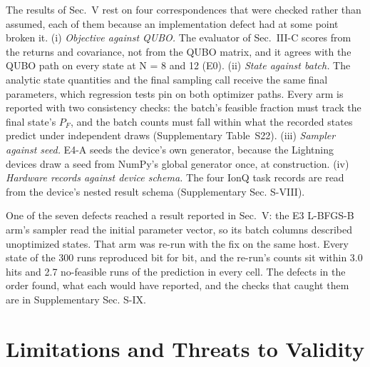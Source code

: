 \documentclass{ieeeaccess}
\begin{document}
The results of Sec.~V rest on four correspondences that were checked rather than assumed, each of them because an implementation defect had at some point broken it. (i) \textit{Objective against QUBO.} The evaluator of Sec.~III-C scores from the returns and covariance, not from the QUBO matrix, and it agrees with the QUBO path on every state at N = 8 and 12 (E0). (ii) \textit{State against batch.} The analytic state quantities and the final sampling call receive the same final parameters, which regression tests pin on both optimizer paths. Every arm is reported with two consistency checks: the batch's feasible fraction must track the final state's $P_{F}$, and the batch counts must fall within what the recorded states predict under independent draws (Supplementary Table~S22). (iii) \textit{Sampler against seed.} E4-A seeds the device's own generator, because the Lightning devices draw a seed from NumPy's global generator once, at construction. (iv) \textit{Hardware records against device schema.} The four IonQ task records are read from the device's nested result schema (Supplementary Sec. S-VIII).


One of the seven defects reached a result reported in Sec.~V: the E3 L-BFGS-B arm's sampler read the initial parameter vector, so its batch columns described unoptimized states. That arm was re-run with the fix on the same host. Every state of the 300 runs reproduced bit for bit, and the re-run's counts sit within 3.0 hits and 2.7 no-feasible runs of the prediction in every cell. The defects in the order found, what each would have reported, and the checks that caught them are in Supplementary Sec. S-IX.


\section{Limitations and Threats to Validity}
\end{document}

